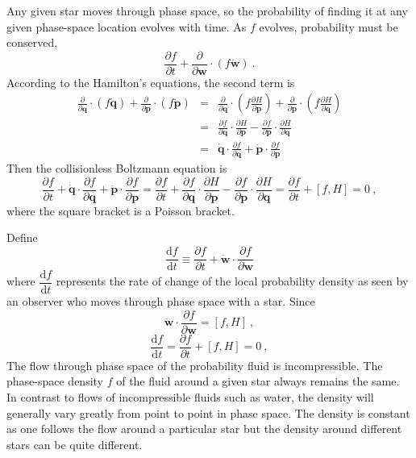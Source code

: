 \documentclass[12pt,a4paper]{article}
\renewcommand{\vec}[1]{\boldsymbol{#1}}
\newcommand{\dif}{\mathrm{d}}
\begin{document}
Any given star moves through phase space, so the probability of finding it at any given phase-space location evolves with time. As $f$ evolves, probability must be conserved, 
\begin{equation}
\frac{\partial f}{\partial t} +\frac{\partial }{\partial \vec{w}}\cdot (f \dot{\vec{w}}) ~.
\end{equation}
According to the Hamilton's equations, the second term is
\begin{eqnarray}
\nonumber \frac{\partial }{\partial \vec{q}}\cdot (f \dot{\vec{q}}) +\frac{\partial }{\partial \vec{p}}\cdot (f \dot{\vec{p}}) &=& \frac{\partial }{\partial \vec{q}}\cdot \left(f \frac{\partial H}{\partial \vec{p}} \right) +\frac{\partial }{\partial \vec{p}}\cdot \left(f \frac{\partial H}{\partial \vec{q}} \right) \\
\nonumber &=& \frac{\partial f}{\partial \vec{q}}\cdot \frac{\partial H}{\partial \vec{p}} -\frac{\partial f}{\partial \vec{p}} \cdot \frac{\partial H}{\partial \vec{q}} \\
&=& \dot{\vec{q}} \cdot \frac{\partial f}{\partial \vec{q}}+ \dot{\vec{p}}\cdot \frac{\partial f}{\partial \vec{p}}
\end{eqnarray}
Then the collisionless Boltzmann equation is
\begin{equation}
\frac{\partial f}{\partial t} +\dot{\vec{q}} \cdot \frac{\partial f}{\partial \vec{q}}+ \dot{\vec{p}}\cdot \frac{\partial f}{\partial \vec{p}} = \frac{\partial f}{\partial t} +\frac{\partial f}{\partial \vec{q}}\cdot \frac{\partial H}{\partial \vec{p}} -\frac{\partial f}{\partial \vec{p}}\cdot \frac{\partial H}{\partial \vec{q}} = \frac{\partial f}{\partial t} + [f, H] = 0 ~,
\end{equation}
where the square bracket is a Poisson bracket.

Define 
\begin{equation}
\frac{\dif f}{\dif t} \equiv \frac{\partial f}{\partial t} +\dot{\vec{w}} \cdot \frac{\partial f}{\partial \vec{w}}
\end{equation}
where $\dfrac{\dif f}{\dif t}$ represents the rate of change of the local probability density as seen by an observer who moves through phase space with a star. Since
\begin{equation}
\dot{\vec{w}} \cdot \frac{\partial f}{\partial \vec{w}} = [f, H] ~,
\end{equation}
\begin{equation}
\frac{\dif f}{\dif t} = \frac{\partial f}{\partial t} +[f, H] = 0 ~,
\end{equation}
The flow through phase space of the probability fluid is incompressible. The phase-space density $f$ of the fluid around a given star always remains the same. In contrast to flows of incompressible fluids such as water, the density will generally vary greatly from point to point in phase space. The density is constant as one follows the flow around a particular star but the density around different stars can be quite different.
\end{document}
